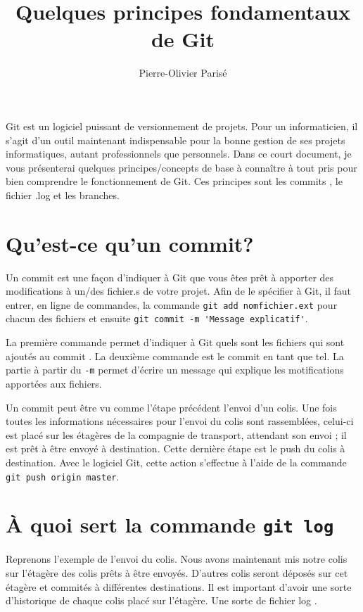 \documentclass[12pt,a4paper]{article}
\title{Quelques principes fondamentaux de Git}
\author{Pierre-Olivier Parisé}
\begin{document}
\maketitle

Git est un logiciel puissant de versionnement de projets. Pour un informaticien, il s'agit d'un outil maintenant indispensable pour la bonne gestion de ses projets informatiques, autant professionnels que personnels. Dans ce court document, je vous présenterai quelques principes/concepts de base à connaître à tout pris pour bien comprendre le fonctionnement de Git. Ces principes sont les \og commits \fg{}, le fichier \og .log \fg{} et les branches.

\section{Qu'est-ce qu'un commit?}

Un \og commit \fg{} est une façon d'indiquer à Git que vous êtes prêt à apporter des modifications à un/des fichier.s de votre projet. Afin de le spécifier à Git, il faut entrer, en ligne de commandes, la commande \lstinline!git add nomfichier.ext! pour chacun des fichiers et ensuite \lstinline!git commit -m 'Message explicatif'!. 

La première commande permet d'indiquer à Git quels sont les fichiers qui sont ajoutés au \og commit \fg{}. La deuxième commande est le \og commit \fg{} en tant que tel. La partie à partir du \lstinline!-m! permet d'écrire un message qui explique les motifications apportées aux fichiers. 

Un \og commit \fg{} peut être vu comme l'étape précédent l'envoi d'un colis. Une fois toutes les informations nécessaires pour l'envoi du colis sont rassemblées, celui-ci est placé sur les étagères de la compagnie de transport, attendant son envoi ; il est prêt à être envoyé à destination. Cette dernière étape est le \og push \fg{} du colis à destination. Avec le logiciel Git, cette action s'effectue à l'aide de la commande \lstinline!git push origin master!.

\section{À quoi sert la commande \lstinline!git log!}

Reprenons l'exemple de l'envoi du colis. Nous avons maintenant mis notre colis sur l'étagère des colis prêts à être envoyés. D'autres colis seront déposés sur cet étagère et \og commités \fg{} à différentes destinations. Il est important d'avoir une sorte d'historique de chaque colis placé sur l'étagère. Une sorte de fichier \og log \fg{}. 
\end{document}
